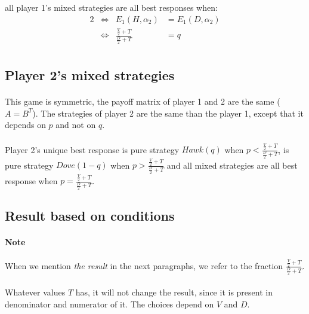 \documentclass[letterpaper]{article}
\begin{document}
all player 1’s mixed strategies are all best responses when:
        \begin{alignat*}{2}
        &\iff & E_1(H, \alpha_2) &= E_1(D, \alpha_2) \\
        &\iff & \frac{\frac{V}{2} + T}{\frac{D}{2} + T}
        &= q \\
        \end{alignat*}


\subsection{Player 2's mixed strategies}
\paragraph{}

This game is symmetric, the payoff matrix of player 1 and 2 are the same
($A = B^T$). The strategies of player 2 are the same than the player 1, except
that it depends on $p$ and not on $q$.
\paragraph{}

Player 2's unique best response is pure strategy $Hawk(q)$
when $p < \frac{\frac{V}{2} + T}{\frac{D}{2} + T}$,
is pure strategy $Dove(1 - q)$ when
$p > \frac{\frac{V}{2} + T}{\frac{D}{2} + T}$
and all mixed strategies are all best response when
$p = \frac{\frac{V}{2} + T}{\frac{D}{2} + T}$.

\subsection{Result based on conditions}

\paragraph{Note} When we mention \textit{the result} in the next paragraphs,
we refer to the fraction $\frac{\frac{V}{2} + T}{\frac{D}{2} + T}$.


\paragraph{}

Whatever values $T$ has, it will not change the result, since it is
present in denominator and numerator of it. The choices depend on
$V$ and $D$.

\paragraph{}
\end{document}
